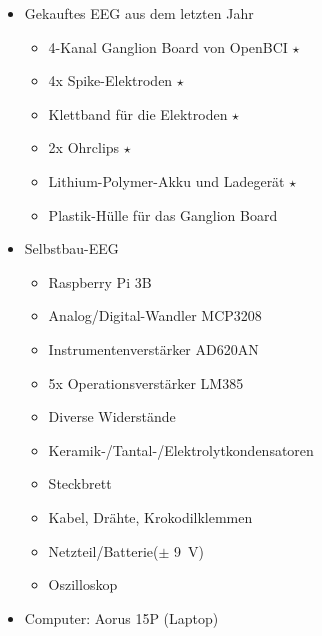 \documentclass[10pt]{article}
\begin{document}
\begin{itemize}
    \item Gekauftes EEG aus dem letzten Jahr %
        \vspace*{-2ex}
        \begin{multicols}{2} %
        \begin{itemize} %
            \item 4-Kanal Ganglion Board von OpenBCI $\star$
            \item 4x Spike-Elektroden $\star$
            \item Klettband für die Elektroden $\star$
            \item 2x Ohrclips $\star$
            \item Lithium-Polymer-Akku und Ladegerät $\star$
            \item Plastik-Hülle für das Ganglion Board
        \end{itemize}
        \end{multicols}
        \vspace*{-2ex}
    \item Selbstbau-EEG
        \vspace*{-2ex}
        \begin{multicols}{2}
        \begin{itemize}
            \item Raspberry Pi 3B
            \item Analog/Digital-Wandler MCP3208
            \item Instrumentenverstärker AD620AN
            \item 5x Operationsverstärker LM385
            \item Diverse Widerstände
            \item Keramik-/Tantal-/Elektrolytkondensatoren %
            \item Steckbrett
            \item Kabel, Drähte, Krokodilklemmen
            \item Netzteil/Batterie($\pm$ \SI{9}{\volt})
            \item Oszilloskop
        \end{itemize}
        \end{multicols}
        \vspace*{-2ex}
    \item Computer: Aorus 15P (Laptop)
    \vspace*{-2ex}
    \begin{multicols}{3}
    \begin{itemize}

\end{itemize}
\end{multicols}
\end{itemize}
\end{document}
